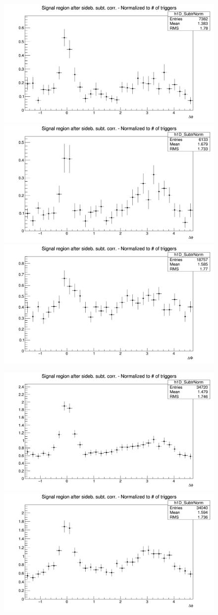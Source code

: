 \begin{figure}[!htbp]
\centering
{\includegraphics[width=0.31\linewidth, height=0.23\linewidth]{figures/Dzero/AzimCorrDistr_Dzero_Canvas_PtIntBins9to11_PoolInt_thr2dotto3dot.png}}
{\includegraphics[width=0.31\linewidth, height=0.23\linewidth]{figures/DplusPlotsweff/AzimCorrDistr_Dplus_Canvas_PtIntBins8to12_PoolInt_thr2dotto3dot.png}}
{\includegraphics[width=0.31\linewidth, height=0.23\linewidth]{figures/Dstar_wEFF/AzimCorrDistr_Dstar_Canvas_PtIntBins7to9_PoolInt_thr2dotto3dot.png}}


{\includegraphics[width=0.31\linewidth, height=0.23\linewidth]{figures/Dzero/AzimCorrDistr_Dzero_Canvas_PtIntBins9to11_PoolInt_thr1dotto3dot.png}}
{\includegraphics[width=0.31\linewidth, height=0.23\linewidth]{figures/DplusPlotsweff/AzimCorrDistr_Dplus_Canvas_PtIntBins8to12_PoolInt_thr1dotto3dot.png}}



\end{figure}
